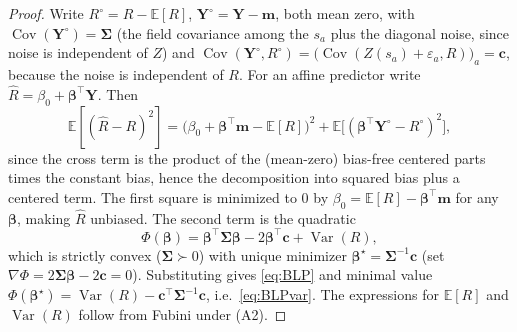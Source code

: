\documentclass{amsart}
\theoremstyle{definition}
\newcommand{\E}{\mathbb{E}}
\newcommand{\Var}{\operatorname{Var}}
\newcommand{\Cov}{\operatorname{Cov}}
\newcommand{\Rhat}{\widehat R}
\begin{document}
\begin{proof}
Write $R^\circ=R-\E[R]$, $\mathbf Y^\circ=\mathbf Y-\mathbf m$, both
mean zero, with $\Cov(\mathbf Y^\circ)=\boldsymbol\Sigma$ (the field
covariance among the $s_a$ plus the diagonal noise, since noise is
independent of $Z$) and $\Cov(\mathbf Y^\circ,R^\circ)
=\big(\Cov(Z(s_a)+\varepsilon_a, R)\big)_a=\mathbf c$, because the noise is
independent of $R$. For an affine predictor write
$\Rhat=\beta_0+\boldsymbol\beta^\top\mathbf Y$. Then
\[
\E[(\Rhat-R)^2]
=\big(\beta_0+\boldsymbol\beta^\top\mathbf m-\E[R]\big)^2
+\E\big[(\boldsymbol\beta^\top\mathbf Y^\circ-R^\circ)^2\big],
\]
since the cross term is the product of the (mean-zero) bias-free centered
parts times the constant bias, hence the decomposition into squared bias
plus a centered term. The first square is minimized to $0$ by
$\beta_0=\E[R]-\boldsymbol\beta^\top\mathbf m$ for any $\boldsymbol\beta$,
making $\Rhat$ unbiased. The second term is the quadratic
\[
\Phi(\boldsymbol\beta)
=\boldsymbol\beta^\top\boldsymbol\Sigma\boldsymbol\beta
-2\boldsymbol\beta^\top\mathbf c+\Var(R),
\]
which is strictly convex ($\boldsymbol\Sigma\succ0$) with unique minimizer
$\boldsymbol\beta^\star=\boldsymbol\Sigma^{-1}\mathbf c$ (set
$\nabla\Phi=2\boldsymbol\Sigma\boldsymbol\beta-2\mathbf c=0$). Substituting
gives \eqref{eq:BLP} and minimal value
$\Phi(\boldsymbol\beta^\star)=\Var(R)-\mathbf c^\top\boldsymbol\Sigma^{-1}
\mathbf c$, i.e.\ \eqref{eq:BLPvar}. The expressions for $\E[R]$ and
$\Var(R)$ follow from Fubini under (A2).
\end{proof}
\end{document}
